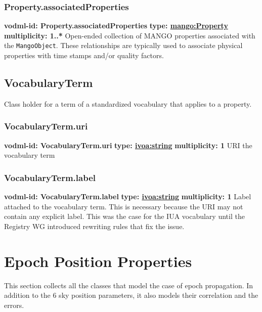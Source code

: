     \subsubsection{Property.associatedProperties}
    \textbf{vodml-id: Property.associatedProperties} \newline
    \textbf{type: \hyperref[sect:Property]{mango:Property}} \newline
    \textbf{multiplicity: 1..*} \newline
    Open-ended collection of MANGO properties associated with the \texttt{MangoObject}. These relationships are typically used to associate physical properties with time stamps and/or quality factors.

  \subsection{VocabularyTerm}
    \label{sect:VocabularyTerm}
    Class holder for a term of a standardized vocabulary that applies to a property.

    \subsubsection{VocabularyTerm.uri}
    \textbf{vodml-id: VocabularyTerm.uri} \newline
    \textbf{type: \hyperref[sect:ivoa]{ivoa:string}} \newline
    \textbf{multiplicity: 1} \newline
    URI the vocabulary term

    \subsubsection{VocabularyTerm.label}
    \textbf{vodml-id: VocabularyTerm.label} \newline
    \textbf{type: \hyperref[sect:ivoa]{ivoa:string}} \newline
    \textbf{multiplicity: 1} \newline
    Label attached to the vocabulary term. This is necessary because the URI may not contain any explicit label. This was the case for the IUA vocabulary until the Registry WG introduced rewriting rules that fix the issue.

\section{Epoch Position Properties}
This section collects all the classes that model the case of epoch propagation. 
In addition to the 6 sky position parameters, it also models their correlation and the errors.
